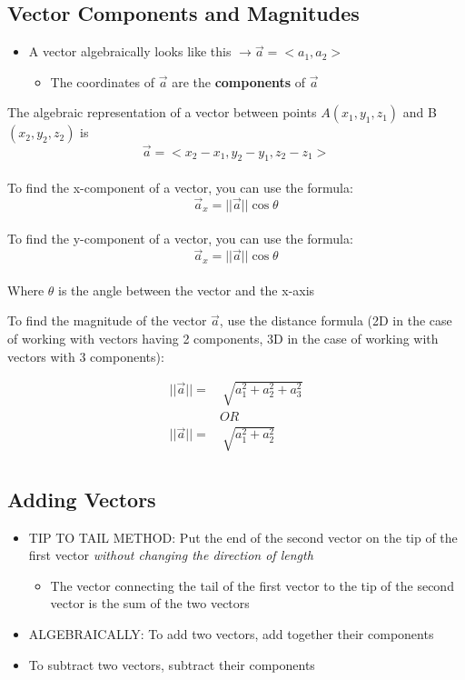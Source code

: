 \documentclass{package/notes}
\begin{document}
\subsection{Vector Components and Magnitudes}
\begin{itemize}
	\item A vector algebraically looks like this $\to \vec{a} = <a_1, a_2>$ 
	\begin{itemize}
		\item The coordinates of $\vec a$ are the \textbf{components} of $\vec a$ 
	\end{itemize}
\end{itemize}

\begin{proposition}
	The algebraic representation of a vector between points $A(x_1, y_1, z_1)$ and B$(x_2, y_2,z_2)$ is
	$$\vec a = <x_2-x_1,y_2-y_1,z_2-z_1>$$\\

	To find the x-component of a vector, you can use the formula:
	$$\vec a_x = ||\vec a||\cos\theta$$\\

	To find the y-component of a vector, you can use the formula:
	$$\vec a_x = ||\vec a||\cos\theta$$\\

	Where $\theta$ is the angle between the vector and the x-axis
\end{proposition}

\begin{proposition}
	To find the magnitude of the vector $\vec a$, use the distance formula (2D in the case of working with vectors having 2 components, 3D in the case of working with vectors with 3 components):

	\begin{equation*}
		\begin{aligned}
			||\vec a|| =&\: \sqrt {a_1^2 + a_2^2 + a_3^2}\\
			&OR\\
			||\vec a|| =&\: \sqrt {a_1^2 + a_2^2}\\
		\end{aligned}
	\end{equation*}
\end{proposition}

\subsection{Adding Vectors}
\begin{itemize}
	\item TIP TO TAIL METHOD: Put the end of the second vector on the tip of the first vector \textit{without changing the direction of length}
	\begin{itemize}
		\item The vector connecting the tail of the first vector to the tip of the second vector is the sum of the two vectors
	\end{itemize}
	\item ALGEBRAICALLY: To add two vectors, add together their components
	\item To subtract two vectors, subtract their components
\end{itemize}
\end{document}
